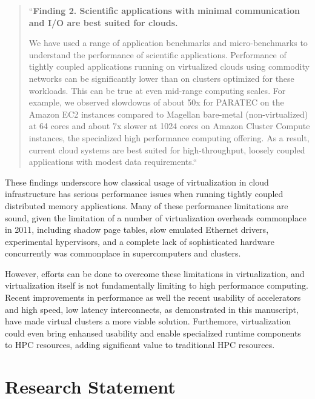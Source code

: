\begin{quote}
``\textbf{Finding 2. Scientific applications with minimal communication and I/O are best suited for
clouds.}

We have used a range of application benchmarks and micro-benchmarks to understand the performance of scientific applications. Performance of tightly coupled applications running on virtualized clouds using commodity networks can be significantly lower than on clusters optimized for these workloads. This can be true at even mid-range computing scales. For example, we observed slowdowns of about 50x for PARATEC on the Amazon EC2 instances compared to Magellan bare-metal (non-virtualized) at 64 cores and about 7x slower at 1024 cores on Amazon Cluster Compute instances, the specialized high performance computing offering. As a result, current cloud systems are best suited for high-throughput, loosely coupled applications with modest data requirements.``
\end{quote}



These findings underscore how classical usage of virtualization in cloud infrastructure has serious performance issues when running tightly coupled distributed memory applications. Many of these performance limitations are sound, given the limitation of a number of virtualization overheads commonplace in 2011, including shadow page tables, slow emulated Ethernet drivers, experimental hypervisors, and a complete lack of sophisticated hardware concurrently was commonplace in supercomputers and clusters. 

However, efforts can be done to overcome these limitations in virtualization, and virtualization itself is not fundamentally limiting to high performance computing. Recent improvements in performance as well the recent usability of accelerators and high speed, low latency interconnects, as demonstrated in this manuscript, have made virtual clusters a more viable solution.  Furthemore, virtualization could even bring enhansed usability and enable specialized runtime components to HPC resources, adding significant value to traditional HPC resources.  



 




\section{Research Statement}
\label{sec:stmt}



